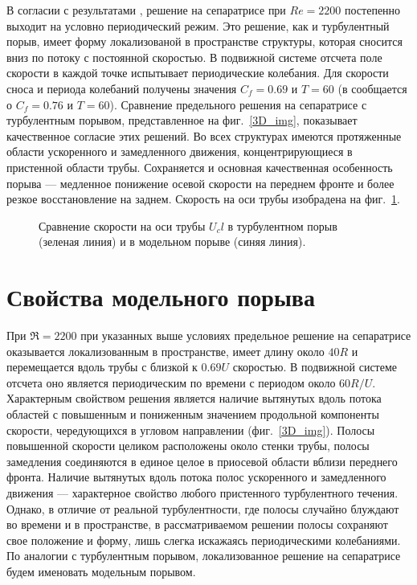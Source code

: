 В согласии с результатами \cite{Avila2013}, решение на сепаратрисе при $Re=2200$ постепенно выходит на условно периодический режим. Это решение, как и турбулентный порыв, имеет форму локализованой в пространстве структуры, которая сносится вниз по потоку с постоянной скоростью. В подвижной системе отсчета поле скорости в каждой точке испытывает периодические колебания. Для скорости сноса и периода колебаний получены значения $C_f=0.69$ и $T=60$ (в \cite{Avila2013} сообщается о $C_f=0.76$ и $T=60$). Сравнение предельного решения на сепаратрисе с турбулентным порывом, представленное на фиг.~\ref{3D_img}, показывает качественное согласие этих решений. Во всех структурах имеются протяженные области ускоренного и замедленного движения, концентрирующиеся в пристенной области трубы. Сохраняется и основная качественная особенность порыва --- медленное понижение осевой скорости на переднем фронте и более резкое восстановление на заднем. Скорость на оси трубы изобрадена на фиг.~\ref{ucl_cmp_img}. 

\begin{figure}[h]
\caption{Сравнение скорости на оси трубы $U_cl$ в турбулентном порыв (зеленая линия) и в модельном порыве (синяя линия).}
\label{ucl_cmp_img}
\end{figure}

\section{Свойства модельного порыва}

При $\Re=2200$ при указанных выше условиях предельное решение на сепаратрисе оказывается локализованным в пространстве, имеет длину около $40R$ и перемещается вдоль трубы с близкой к $0.69U$ скоростью. В подвижной системе отсчета оно является периодическим по времени с периодом около $60 R/U$. Характерным свойством решения является наличие вытянутых вдоль потока областей с повышенным и пониженным значением продольной компоненты скорости, чередующихся в угловом направлении (фиг.~\ref{3D_img}). Полосы повышенной скорости целиком расположены около стенки трубы, полосы замедления соединяются в единое целое в приосевой области вблизи переднего фронта. Наличие вытянутых вдоль потока полос ускоренного и замедленного движения --- характерное свойство любого пристенного турбулентного течения. Однако, в отличие от реальной турбулентности, где полосы случайно блуждают во времени и в пространстве, в рассматриваемом решении полосы сохраняют свое положение и форму, лишь слегка искажаясь периодическими колебаниями. По аналогии с турбулентным порывом, локализованное решение на сепаратрисе будем именовать модельным порывом.

